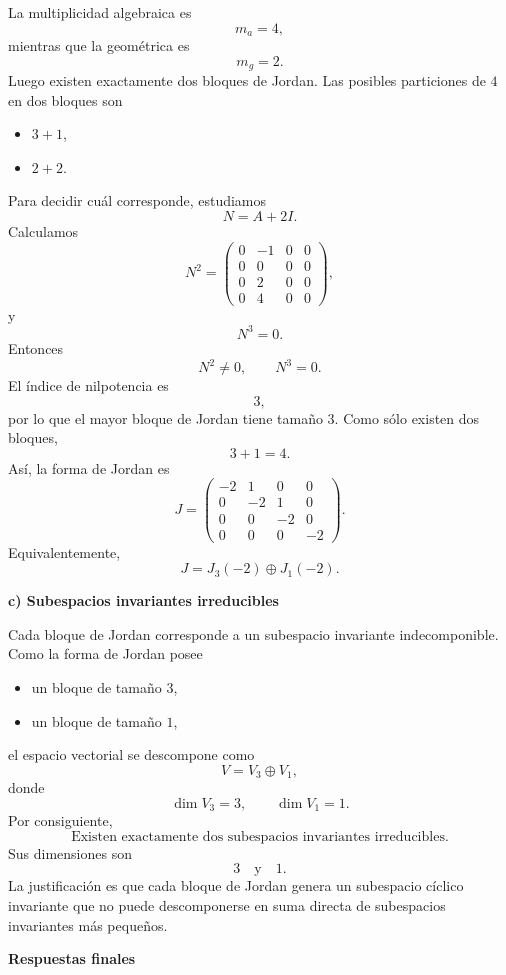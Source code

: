 \documentclass[11pt,spanish]{article}
\begin{document}
La multiplicidad algebraica es
$$
m_a=4,
$$
mientras que la geométrica es
$$
m_g=2.
$$
Luego existen exactamente dos bloques de Jordan.
Las posibles particiones de $4$ en dos bloques son
\begin{itemize}
\item $3+1$,
\item $2+2$.
\end{itemize}
Para decidir cuál corresponde, estudiamos
$$
N=A+2I.
$$
Calculamos
$$
N^2=
\begin{pmatrix}
0&-1&0&0\\
0&0&0&0\\
0&2&0&0\\
0&4&0&0
\end{pmatrix},
$$
y
$$
N^3=0.
$$
Entonces
$$
N^2\neq0,\qquad N^3=0.
$$
El índice de nilpotencia es
$$
3,
$$
por lo que el mayor bloque de Jordan tiene tamaño $3$.
Como sólo existen dos bloques,
$$
3+1=4.
$$
Así, la forma de Jordan es
$$
\boxed{
J=
\begin{pmatrix}
-2&1&0&0\\
0&-2&1&0\\
0&0&-2&0\\
0&0&0&-2
\end{pmatrix}.
}
$$
Equivalentemente,
$$
J=
J_3(-2)\oplus J_1(-2).
$$

{\bf c) Subespacios invariantes irreducibles}

Cada bloque de Jordan corresponde a un subespacio invariante indecomponible.
Como la forma de Jordan posee
\begin{itemize}
\item un bloque de tamaño $3$,
\item un bloque de tamaño $1$,
\end{itemize}
el espacio vectorial se descompone como
$$
V=V_3\oplus V_1,
$$
donde
$$
\dim V_3=3,\qquad
\dim V_1=1.
$$
Por consiguiente,
$$
\boxed{\text{Existen exactamente dos subespacios invariantes irreducibles.}}
$$
Sus dimensiones son
$$
\boxed{3\quad\text{y}\quad1.}
$$
La justificación es que cada bloque de Jordan genera un subespacio cíclico invariante que no puede descomponerse en suma directa de subespacios invariantes más pequeños.

{\bf Respuestas finales}
\end{document}
